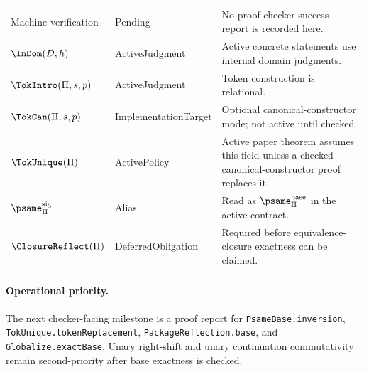 \begin{longtable}{p{}p{}p{}}
Machine verification & Pending & No proof-checker success report is recorded here.\\
\(\InDom(D,h)\) & ActiveJudgment & Active concrete statements use internal domain judgments.\\
\(\TokIntro(\Pi,s,p)\) & ActiveJudgment & Token construction is relational.\\
\(\TokCan(\Pi,s,p)\) & ImplementationTarget & Optional canonical-constructor mode; not active until checked.\\
\(\TokUnique(\Pi)\) & ActivePolicy & Active paper theorem assumes this field unless a checked canonical-constructor proof replaces it.\\
\(\psame_{\Pi}^{\mathrm{sig}}\) & Alias & Read as \(\psame_{\Pi}^{\mathrm{base}}\) in the active contract.\\
\(\ClosureReflect(\Pi)\) & DeferredObligation & Required before equivalence-closure exactness can be claimed.\\
\bottomrule
\end{longtable}

\paragraph{Operational priority.}
The next checker-facing milestone is a proof report for \texttt{PsameBase.inversion}, \texttt{TokUnique.tokenReplacement}, \texttt{PackageReflection.base}, and \texttt{Globalize.exactBase}. Unary right-shift and unary continuation commutativity remain second-priority after base exactness is checked.
